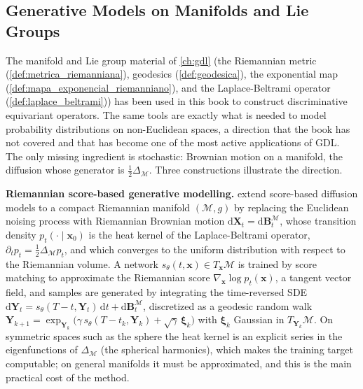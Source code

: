 \subsection{Generative Models on Manifolds and Lie Groups}\label{subsec:modelos_generativos_variedades}

The manifold and Lie group material of \autoref{ch:gdl} (the Riemannian metric (\autoref{def:metrica_riemanniana}), geodesics (\autoref{def:geodesica}), the exponential map (\autoref{def:mapa_exponencial_riemanniano}), and the Laplace-Beltrami operator (\autoref{def:laplace_beltrami})) has been used in this book to construct discriminative equivariant operators. The same tools are exactly what is needed to model probability distributions on non-Euclidean spaces, a direction that the book has not covered and that has become one of the most active applications of \gls{GDL}. The only missing ingredient is stochastic: Brownian motion on a manifold, the diffusion whose generator is $\tfrac{1}{2}\Delta_\mathcal{M}$. Three constructions illustrate the direction.

\textbf{Riemannian score-based generative modelling.} \citet{debortoli2022riemanniansgm} extend score-based diffusion models to a compact Riemannian manifold $(\mathcal{M}, g)$ by replacing the Euclidean noising process with Riemannian Brownian motion $\mathrm{d}\mathbf{X}_t = \mathrm{d}\mathbf{B}^\mathcal{M}_t$, whose transition density $p_t(\cdot \mid \mathbf{x}_0)$ is the heat kernel of the Laplace-Beltrami operator, $\partial_t p_t = \tfrac{1}{2}\Delta_\mathcal{M} p_t$, and which converges to the uniform distribution with respect to the Riemannian volume. A network $s_\theta(t, \mathbf{x}) \in T_\mathbf{x}\mathcal{M}$ is trained by score matching to approximate the Riemannian score $\nabla_\mathbf{x} \log p_t(\mathbf{x})$, a tangent vector field, and samples are generated by integrating the time-reversed SDE $\mathrm{d}\mathbf{Y}_t = s_\theta(T - t, \mathbf{Y}_t)\,\mathrm{d}t + \mathrm{d}\mathbf{B}^\mathcal{M}_t$, discretized as a geodesic random walk $\mathbf{Y}_{k+1} = \exp_{\mathbf{Y}_k}\!\big(\gamma\, s_\theta(T - t_k, \mathbf{Y}_k) + \sqrt{\gamma}\,\boldsymbol{\xi}_k\big)$ with $\boldsymbol{\xi}_k$ Gaussian in $T_{\mathbf{Y}_k}\mathcal{M}$. On symmetric spaces such as the sphere the heat kernel is an explicit series in the eigenfunctions of $\Delta_\mathcal{M}$ (the spherical harmonics), which makes the training target computable; on general manifolds it must be approximated, and this is the main practical cost of the method.

